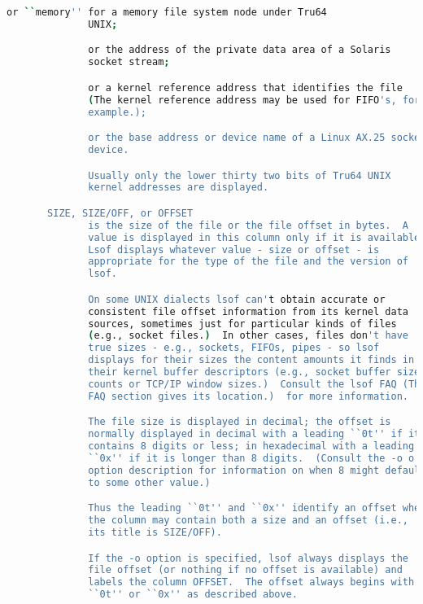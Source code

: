 {{\begin{lstlisting}[language=bash]
              or ``memory'' for a memory file system node under Tru64
              UNIX;

              or the address of the private data area of a Solaris
              socket stream;

              or a kernel reference address that identifies the file
              (The kernel reference address may be used for FIFO's, for
              example.);

              or the base address or device name of a Linux AX.25 socket
              device.

              Usually only the lower thirty two bits of Tru64 UNIX
              kernel addresses are displayed.

       SIZE, SIZE/OFF, or OFFSET
              is the size of the file or the file offset in bytes.  A
              value is displayed in this column only if it is available.
              Lsof displays whatever value - size or offset - is
              appropriate for the type of the file and the version of
              lsof.

              On some UNIX dialects lsof can't obtain accurate or
              consistent file offset information from its kernel data
              sources, sometimes just for particular kinds of files
              (e.g., socket files.)  In other cases, files don't have
              true sizes - e.g., sockets, FIFOs, pipes - so lsof
              displays for their sizes the content amounts it finds in
              their kernel buffer descriptors (e.g., socket buffer size
              counts or TCP/IP window sizes.)  Consult the lsof FAQ (The
              FAQ section gives its location.)  for more information.

              The file size is displayed in decimal; the offset is
              normally displayed in decimal with a leading ``0t'' if it
              contains 8 digits or less; in hexadecimal with a leading
              ``0x'' if it is longer than 8 digits.  (Consult the -o o
              option description for information on when 8 might default
              to some other value.)

              Thus the leading ``0t'' and ``0x'' identify an offset when
              the column may contain both a size and an offset (i.e.,
              its title is SIZE/OFF).

              If the -o option is specified, lsof always displays the
              file offset (or nothing if no offset is available) and
              labels the column OFFSET.  The offset always begins with
              ``0t'' or ``0x'' as described above.


\end{lstlisting}}}
